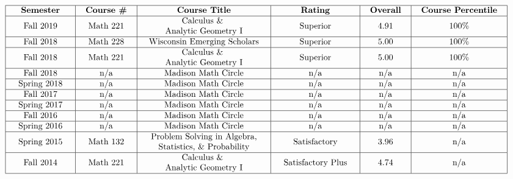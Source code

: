 \documentclass[letterpaper,11pt]{article}
\begin{document}
\[
\begin{tabular}{| c | c | c | c | c | c |}
\hline
\textbf{Semester} & \textbf{Course \#} & \textbf{Course Title} & \textbf{Rating} & \;\;\textbf{Overall}\;\; & \;\;\textbf{Course Percentile}\;\;\\ \hline
Fall 2019& \;\; Math 221 \;\; & $\begin{matrix}
\text{Calculus \& }\\
\text{Analytic Geometry I}
\end{matrix}$ & \;\; Superior \;\;& 4.91 & 100\% \\ \hline

Fall 2018 & \;\; Math 228 \;\; & $\begin{matrix}
\text{Wisconsin Emerging Scholars}
\end{matrix}$ & \;\; Superior \;\;& 5.00 & 100\% \\ \hline

Fall 2018 & \;\; Math 221 \;\; & $\begin{matrix}
\text{Calculus \& }\\
\text{Analytic Geometry I}
\end{matrix}$ & \;\; Superior \;\;& 5.00 & 100\% \\ \hline

Fall 2018 & n/a & Madison Math Circle & n/a & n/a & n/a \\ \hline

Spring 2018 & n/a & Madison Math Circle & n/a & n/a & n/a \\ \hline

Fall 2017 & n/a & Madison Math Circle & n/a & n/a & n/a \\ \hline
\;\; Spring 2017 \;\; & n/a & Madison Math Circle & n/a & n/a & n/a\\ \hline
Fall 2016 & n/a & Madison Math Circle & n/a & n/a & n/a \\ \hline
\;\;  Spring 2016 \;\;  & n/a & Madison Math Circle & n/a & n/a & n/a \\ \hline
\;\;  Spring 2015 \;\; & \;\; Math 132 \;\; & $\quad\begin{matrix}
\text{Problem Solving in Algebra,}\\
\text{Statistics, \& Probability}\end{matrix}\quad$  & Satisfactory & 3.96 & n/a \\ \hline
Fall 2014 & \;\; Math 221 \;\; & $\begin{matrix}
\text{Calculus \& }\\
\text{Analytic Geometry I}
\end{matrix}$ & \;\; Satisfactory Plus \;\;& 4.74 & n/a\\ \hline
\end{tabular}
\]
\end{document}
